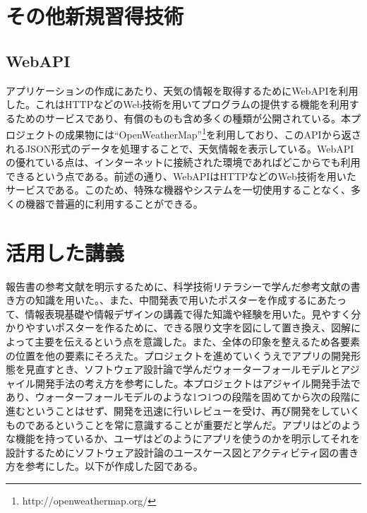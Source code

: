 \documentclass[openany,11pt,papersize]{jsbook}
\begin{document}
\begin{appendix}
\chapter{その他新規習得技術}
\section{WebAPI}
アプリケーションの作成にあたり、天気の情報を取得するためにWebAPIを利用した。これはHTTPなどのWeb技術を用いてプログラムの提供する機能を利用するためのサービスであり、有償のものも含め多くの種類が公開されている。本プロジェクトの成果物には``OpenWeatherMap''\footnote{http://openweathermap.org/}を利用しており、このAPIから返されるJSON形式のデータを処理することで、天気情報を表示している。WebAPIの優れている点は、インターネットに接続された環境であればどこからでも利用できるという点である。前述の通り、WebAPIはHTTPなどのWeb技術を用いたサービスである。このため、特殊な機器やシステムを一切使用することなく、多くの機器で普遍的に利用することができる。

\chapter{活用した講義}
 報告書の参考文献を明示するために、科学技術リテラシーで学んだ参考文献の書き方の知識を用いた。、また、中間発表で用いたポスターを作成するにあたって、情報表現基礎や情報デザインの講義で得た知識や経験を用いた。見やすく分かりやすいポスターを作るために、できる限り文字を図にして置き換え、図解によって主要を伝えるという点を意識した。また、全体の印象を整えるため各要素の位置を他の要素にそろえた。プロジェクトを進めていくうえでアプリの開発形態を見直すとき、ソフトウェア設計論で学んだウォーターフォールモデルとアジャイル開発手法の考え方を参考にした。本プロジェクトはアジャイル開発手法であり、ウォーターフォールモデルのような1つ1つの段階を固めてから次の段階に進むということはせず、開発を迅速に行いレビューを受け、再び開発をしていくものであるということを常に意識することが重要だと学んだ。アプリはどのような機能を持っているか、ユーザはどのようにアプリを使うのかを明示してそれを設計するためにソフトウェア設計論のユースケース図とアクティビティ図の書き方を参考にした。以下が作成した図である。



\end{appendix}
\end{document}
